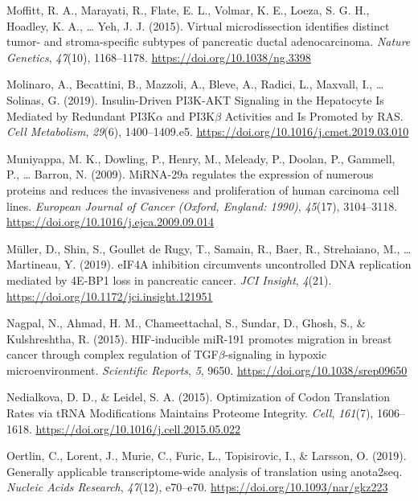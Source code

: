 \documentclass[12pt,openany]{book}
\begin{document}
\hypertarget{ref-Moffitt2015}{}
Moffitt, R. A., Marayati, R., Flate, E. L., Volmar, K. E., Loeza, S. G.
H., Hoadley, K. A., \ldots{} Yeh, J. J. (2015). Virtual microdissection
identifies distinct tumor- and stroma-specific subtypes of pancreatic
ductal adenocarcinoma. \emph{Nature Genetics}, \emph{47}(10),
1168--1178. \url{https://doi.org/10.1038/ng.3398}

\hypertarget{ref-Molinaro2019}{}
Molinaro, A., Becattini, B., Mazzoli, A., Bleve, A., Radici, L.,
Maxvall, I., \ldots{} Solinas, G. (2019). Insulin-Driven PI3K-AKT
Signaling in the Hepatocyte Is Mediated by Redundant PI3K\(\alpha\) and
PI3K\(\beta\) Activities and Is Promoted by RAS. \emph{Cell Metabolism},
\emph{29}(6), 1400--1409.e5.
\url{https://doi.org/10.1016/j.cmet.2019.03.010}

\hypertarget{ref-Muniyappa2009}{}
Muniyappa, M. K., Dowling, P., Henry, M., Meleady, P., Doolan, P.,
Gammell, P., \ldots{} Barron, N. (2009). MiRNA-29a regulates the
expression of numerous proteins and reduces the invasiveness and
proliferation of human carcinoma cell lines. \emph{European Journal of
Cancer (Oxford, England: 1990)}, \emph{45}(17), 3104--3118.
\url{https://doi.org/10.1016/j.ejca.2009.09.014}

\hypertarget{ref-Muller2019}{}
Müller, D., Shin, S., Goullet de Rugy, T., Samain, R., Baer, R.,
Strehaiano, M., \ldots{} Martineau, Y. (2019). eIF4A inhibition
circumvents uncontrolled DNA replication mediated by 4E-BP1 loss in
pancreatic cancer. \emph{JCI Insight}, \emph{4}(21).
\url{https://doi.org/10.1172/jci.insight.121951}

\hypertarget{ref-Nagpal2015}{}
Nagpal, N., Ahmad, H. M., Chameettachal, S., Sundar, D., Ghosh, S., \&
Kulshreshtha, R. (2015). HIF-inducible miR-191 promotes migration in
breast cancer through complex regulation of TGF\(\beta\)-signaling in
hypoxic microenvironment. \emph{Scientific Reports}, \emph{5}, 9650.
\url{https://doi.org/10.1038/srep09650}

\hypertarget{ref-Nedialkova2015}{}
Nedialkova, D. D., \& Leidel, S. A. (2015). Optimization of Codon
Translation Rates via tRNA Modifications Maintains Proteome Integrity.
\emph{Cell}, \emph{161}(7), 1606--1618.
\url{https://doi.org/10.1016/j.cell.2015.05.022}

\hypertarget{ref-Oertlin2019}{}
Oertlin, C., Lorent, J., Murie, C., Furic, L., Topisirovic, I., \&
Larsson, O. (2019). Generally applicable transcriptome-wide analysis of
translation using anota2seq. \emph{Nucleic Acids Research},
\emph{47}(12), e70--e70. \url{https://doi.org/10.1093/nar/gkz223}
\end{document}
